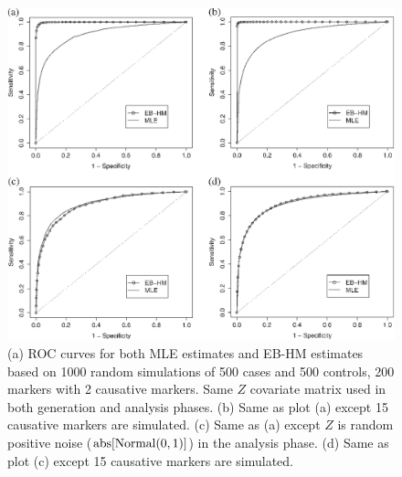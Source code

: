 \documentclass[oupdraft]{bio}
\begin{document}
\begin{figure}[!p]
\centering\includegraphics{fig3.eps}
\caption{(a) ROC curves for both MLE estimates and
EB-HM estimates based on 1000 random simulations of 500
cases and 500 controls, 200 markers with 2 causative
markers. Same $Z$ covariate matrix used in both generation
and analysis phases. (b) Same as plot (a) except 15
causative markers are simulated. (c) Same as (a) except
$Z$ is random positive noise
($\hbox{abs} [ \hbox{Normal} (0, 1) ]$) in the analysis
phase. (d) Same as plot (c) except 15 causative markers
are simulated.}
\label{Fig3}
\end{figure}
\end{document}
